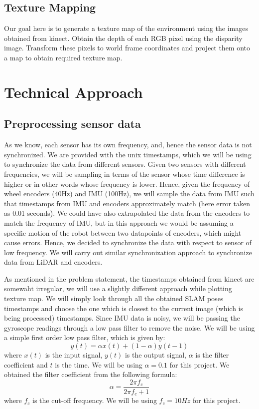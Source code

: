 \documentclass[a4paper]{article}
\begin{document}
\subsection{Texture Mapping}
Our goal here is to generate a texture map of the environment using the images obtained from kinect. Obtain the depth of each RGB pixel using the disparity image. Transform these pixels to world frame coordinates and project them onto a map to obtain required texture map.
\section{Technical Approach}
\subsection{Preprocessing sensor data}
As we know, each sensor has its own frequency, and, hence the sensor data is not synchronized. We are provided with the unix timestamps, which we will be using to synchronize the data from different sensors. Given two sensors with different frequencies, we will be sampling in terms of the sensor whose time difference is higher or in other words whose frequency is lower. Hence, given the frequency of wheel encoders (40Hz) and IMU (100Hz), we will sample the data from IMU such that timestamps from IMU and encoders approximately match (here error taken as 0.01 seconds). We could have also extrapolated the data from the encoders to match the frequency of IMU, but in this approach we would be assuming a specific motion of the robot between two datapoints of encoders, which might cause errors. Hence, we decided to synchronize the data with respect to sensor of low frequency. We will carry out similar synchronization approach to synchronize data from LiDAR and encoders.

As mentioned in the problem statement, the timestamps obtained from kinect are somewaht irregular, we will use a slightly different approach while plotting texture map. We will simply look through all the obtained SLAM poses timestamps and choose the one which is closest to the current image (which is being processed) timestamps.
Since IMU data is noisy, we will be passing the gyroscope readings through a low pass filter to remove the noise. We will be using a simple first order low pass filter, which is given by:
\begin{equation}
y(t) = \alpha x(t) + (1-\alpha) y(t-1)
\end{equation}
where $x(t)$ is the input signal, $y(t)$ is the output signal, $\alpha$ is the filter coefficient and $t$ is the time. We will be using $\alpha = 0.1$ for this project. We obtained the filter coefficient from the following formula:
\begin{equation}
\alpha = \frac{2\pi f_c}{2\pi f_c + 1}
\end{equation}
where $f_c$ is the cut-off frequency. We will be using $f_c = 10Hz$ for this project.
\end{document}
